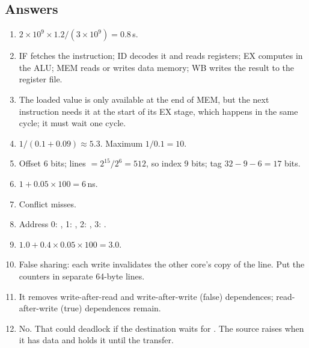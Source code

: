 \subsection*{Answers}
\begin{enumerate}
  \item $2\times10^9 \times 1.2 / (3\times10^9) = 0.8$\,s.
  \item IF fetches the instruction; ID decodes it and reads registers; EX computes in the ALU; MEM reads or writes data memory; WB writes the result to the register file.
  \item The loaded value is only available at the end of MEM, but the next instruction needs it at the start of its EX stage, which happens in the same cycle; it must wait one cycle.
  \item $1/(0.1 + 0.09) \approx 5.3$. Maximum $1/0.1 = 10$.
  \item Offset 6 bits; lines $= 2^{15}/2^6 = 512$, so index 9 bits; tag $32 - 9 - 6 = 17$ bits.
  \item $1 + 0.05 \times 100 = 6$\,ns.
  \item Conflict misses.
  \item Address 0: , 1: , 2: , 3: .
  \item $1.0 + 0.4 \times 0.05 \times 100 = 3.0$.
  \item False sharing: each write invalidates the other core's copy of the line. Put the counters in separate 64-byte lines.
  \item It removes write-after-read and write-after-write (false) dependences; read-after-write (true) dependences remain.
  \item No. That could deadlock if the destination waits for . The source raises  when it has data and holds it until the transfer.
\end{enumerate}
